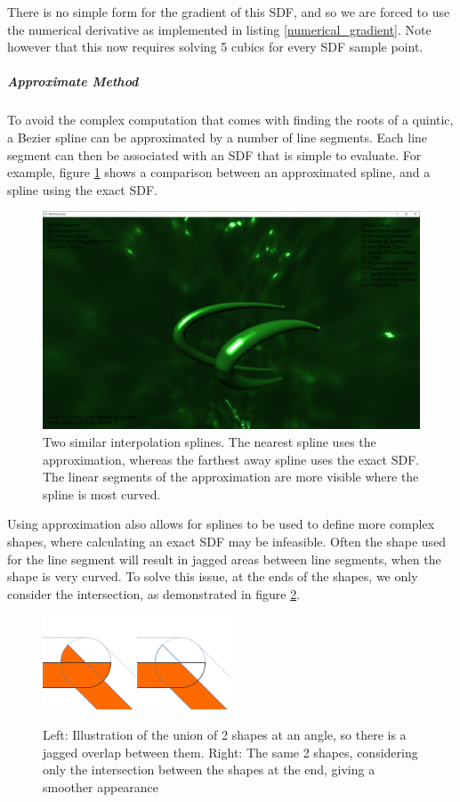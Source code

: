 \documentclass[11pt]{article}
\begin{document}
There is no simple form for the gradient of this SDF, and so we are forced to use the numerical derivative as implemented in listing \ref{numerical_gradient}. Note however that this now requires solving 5 cubics for every SDF sample point.

\subparagraph{Approximate Method}
To avoid the complex computation that comes with finding the roots of a quintic, a Bezier spline can be approximated by a number of line segments. Each line segment can then be associated with an SDF that is simple to evaluate. For example, figure \ref{fig:spline_approximation} shows a comparison between an approximated spline, and a spline using the exact SDF.
\begin{figure}[H]
  \includegraphics[width=\textwidth]{spline_approximation_2.png}
  \caption{Two similar interpolation splines. The nearest spline uses the approximation, whereas the farthest away spline uses the exact SDF. The linear segments of the approximation are more visible where the spline is most curved.}
  \label{fig:spline_approximation}
\end{figure}

Using approximation also allows for splines to be used to define more complex shapes, where calculating an exact SDF may be infeasible. Often the shape used for the line segment will result in jagged areas between line segments, when the shape is very curved. To solve this issue, at the ends of the shapes, we only consider the intersection, as demonstrated in figure \ref{fig:road_double}.

\begin{figure}[H]
  \caption{Left: Illustration of the union of 2 shapes at an angle, so there is a jagged overlap between them. Right: The same 2 shapes, considering only the intersection between the shapes at the end, giving a smoother appearance}
  \includegraphics[width=0.5\textwidth]{road_double.png}
  \label{fig:road_double}
\end{figure}
\end{document}
